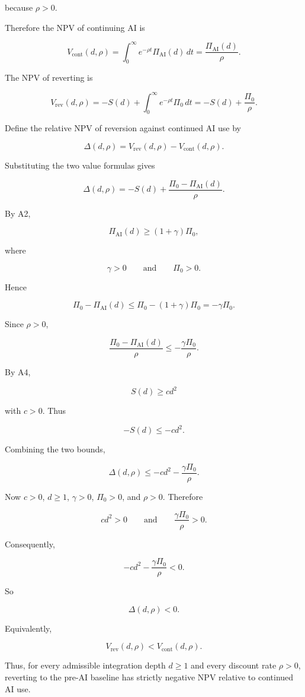 because \(\rho>0\).

Therefore the NPV of continuing AI is

\[
V_{\mathrm{cont}}(d,\rho)
=
\int_0^\infty e^{-\rho t}\Pi_{\mathrm{AI}}(d)\,dt
=
\frac{\Pi_{\mathrm{AI}}(d)}{\rho}.
\]

The NPV of reverting is

\[
V_{\mathrm{rev}}(d,\rho)
=
-S(d)
+
\int_0^\infty e^{-\rho t}\Pi_0\,dt
=
-S(d)+\frac{\Pi_0}{\rho}.
\]

Define the relative NPV of reversion against continued AI use by

\[
\Delta(d,\rho)
=
V_{\mathrm{rev}}(d,\rho)
-
V_{\mathrm{cont}}(d,\rho).
\]

Substituting the two value formulas gives

\[
\Delta(d,\rho)
=
-S(d)
+
\frac{\Pi_0-\Pi_{\mathrm{AI}}(d)}{\rho}.
\]

By A2,

\[
\Pi_{\mathrm{AI}}(d)\ge (1+\gamma)\Pi_0,
\]

where

\[
\gamma>0
\qquad\text{and}\qquad
\Pi_0>0.
\]

Hence

\[
\Pi_0-\Pi_{\mathrm{AI}}(d)
\le
\Pi_0-(1+\gamma)\Pi_0
=
-\gamma\Pi_0.
\]

Since \(\rho>0\),

\[
\frac{\Pi_0-\Pi_{\mathrm{AI}}(d)}{\rho}
\le
-\frac{\gamma\Pi_0}{\rho}.
\]

By A4,

\[
S(d)\ge c d^2
\]

with \(c>0\). Thus

\[
-S(d)\le -c d^2.
\]

Combining the two bounds,

\[
\Delta(d,\rho)
\le
-cd^2-\frac{\gamma\Pi_0}{\rho}.
\]

Now \(c>0\), \(d\ge 1\), \(\gamma>0\), \(\Pi_0>0\), and \(\rho>0\). Therefore

\[
cd^2>0
\qquad\text{and}\qquad
\frac{\gamma\Pi_0}{\rho}>0.
\]

Consequently,

\[
-cd^2-\frac{\gamma\Pi_0}{\rho}<0.
\]

So

\[
\Delta(d,\rho)<0.
\]

Equivalently,

\[
V_{\mathrm{rev}}(d,\rho)<V_{\mathrm{cont}}(d,\rho).
\]

Thus, for every admissible integration depth \(d\ge 1\) and every discount rate \(\rho>0\), reverting to the pre-AI baseline has strictly negative NPV relative to continued AI use.


